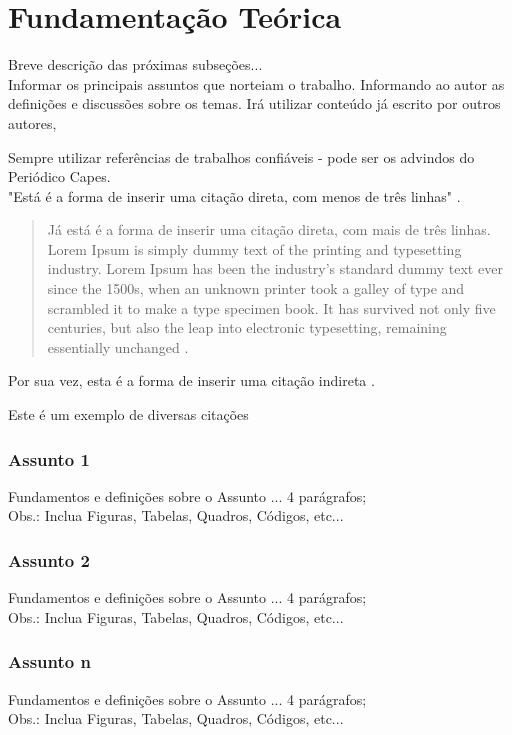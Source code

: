 \chapter{Fundamentação Teórica}

Breve descrição das próximas subseções...\\

Informar os principais assuntos que norteiam o trabalho. Informando ao autor as definições e discussões sobre os temas. Irá utilizar conteúdo já escrito por outros autores,

Sempre utilizar referências de trabalhos confiáveis - pode ser os advindos do Periódico Capes.\\

"Está é a forma de inserir uma citação direta, com menos de três linhas" \cite[p.26]{mcculloch1995}.

\begin{quotation}
	Já está é a forma de inserir uma citação direta, com mais de três linhas. Lorem Ipsum is simply dummy text of the printing and typesetting industry. Lorem Ipsum has been the industry's standard dummy text ever since the 1500s, when an unknown printer took a galley of type and scrambled it to make a type specimen book. It has survived not only five centuries, but also the leap into electronic typesetting, remaining essentially unchanged \cite[p.26]{mcculloch1995}.
\end{quotation}

Por sua vez, esta é a forma de inserir uma citação indireta \cite{tesauro1995}.

Este é um exemplo de diversas citações \cite{tesauro1995,mcculloch1995,massucatto2018}


\subsection{Assunto 1}

Fundamentos e definições sobre o Assunto ... 4 parágrafos;\\
Obs.: Inclua Figuras, Tabelas, Quadros, Códigos, etc...


\subsection{Assunto 2}

Fundamentos e definições sobre o Assunto ... 4 parágrafos;\\
Obs.: Inclua Figuras, Tabelas, Quadros, Códigos, etc...


\subsection{Assunto n}

Fundamentos e definições sobre o Assunto ... 4 parágrafos;\\
Obs.: Inclua Figuras, Tabelas, Quadros, Códigos, etc...
